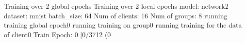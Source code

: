 Training over 2 global epochs
Training over 2 local epochs
model:		 network2
dataset:	 mnist
batch_size:	 64
Num of clients:	 16
Num of groups:	 8
running training global epoch0
running training on group0
running training for the data of client0
Train Epoch: 0 [0/3712 (0%

